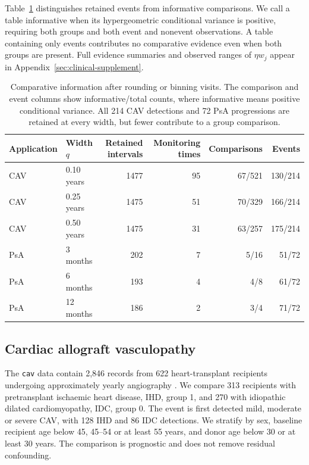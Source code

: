 \documentclass[12pt]{article}
\theoremstyle{definition}
\theoremstyle{remark}
\begin{document}
Table~\ref{tab:clinical-information} distinguishes retained events from informative comparisons. We call a table informative when its hypergeometric conditional variance is positive, requiring both groups and both event and nonevent observations. A table containing only events contributes no comparative evidence even when both groups are present. Full evidence summaries and observed ranges of $\eta w_j$ appear in Appendix~\ref{sec:clinical-supplement}.

\begin{table}[H]
\centering
\small
\caption{Comparative information after rounding or binning visits. The comparison and event columns show informative/total counts, where informative means positive conditional variance. All 214 CAV detections and 72 PsA progressions are retained at every width, but fewer contribute to a group comparison.}
\label{tab:clinical-information}
\begin{tabular}{llrrrr}
\toprule
Application & Width $q$ & Retained intervals & Monitoring times & Comparisons & Events\\
\midrule
CAV & 0.10 years & 1477 & 95 & 67/521 & 130/214\\
CAV & 0.25 years & 1475 & 51 & 70/329 & 166/214\\
CAV & 0.50 years & 1475 & 31 & 63/257 & 175/214\\
PsA & 3 months & 202 & 7 & 5/16 & 51/72\\
PsA & 6 months & 193 & 4 & 4/8 & 61/72\\
PsA & 12 months & 186 & 2 & 3/4 & 71/72\\
\bottomrule
\end{tabular}
\end{table}

\subsection{Cardiac allograft vasculopathy}
\label{sec:application-cav}

The \texttt{cav} data contain 2,846 records from 622 heart-transplant recipients undergoing approximately yearly angiography \citep{Jackson2011msm,SharplesEtAl2003}. We compare 313 recipients with pretransplant ischaemic heart disease, IHD, group 1, and 270 with idiopathic dilated cardiomyopathy, IDC, group 0. The event is first detected mild, moderate or severe CAV, with 128 IHD and 86 IDC detections. We stratify by sex, baseline recipient age below 45, 45--54 or at least 55 years, and donor age below 30 or at least 30 years. The comparison is prognostic and does not remove residual confounding.
\end{document}
